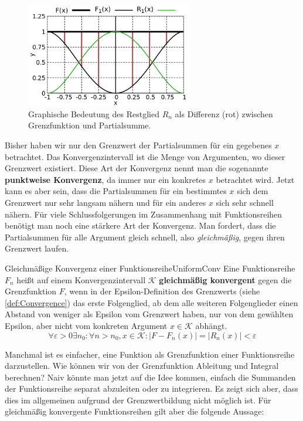\begin{figure}
    \centering
    \includegraphics[width=0.65\textwidth]{./gnuplot/function-sum-error-term}
    \caption[Restglied zwischen Grenzfunktion und Partialsumme]{Graphische Bedeutung des Restglied $R_n$ als Differenz (rot) zwischen Grenzfunktion und Partialsumme.}
    \label{fig:ExFunErrTerm}
\end{figure}

Bisher haben wir nur den Grenzwert der Partialsummen für ein gegebenes $x$ betrachtet. Das Konvergenzintervall ist die Menge von Argumenten, wo dieser Grenzwert existiert. Diese Art der Konvergenz nennt man die sogenannte \textbf{punktweise Konvergenz}, da immer nur ein konkretes $x$ betrachtet wird. Jetzt kann es aber sein, dass die Partialsummen für ein bestimmtes $x$ sich dem Grenzwert nur sehr langsam nähern und für ein anderes $x$ sich sehr schnell nähern. Für viele Schlussfolgerungen im Zusammenhang mit Funktionsreihen benötigt man noch eine stärkere Art der Konvergenz. Man fordert, dass die Partialsummen für alle Argument gleich schnell, also \emph{gleichmäßig}, gegen ihren Grenzwert laufen.

\begin{definition}{Gleichmäßige Konvergenz einer Funktionsreihe}{UniformConv}
    Eine Funktionsreihe $F_n$ heißt auf einem Konvergenzintervall $\mathcal{K}$ \textbf{gleichmäßig konvergent} gegen die Grenzfunktion $F$, wenn in der Epsilon-Definition des Grenzwerts (siehe \ref{def:Convergence}) das erste Folgenglied, ab dem alle weiteren Folgenglieder einen Abstand von weniger als Epsilon vom Grenzwert haben, nur von dem gewählten Epsilon, aber nicht vom konkreten Argument $x\in\mathcal{K}$ abhängt.
    $$
        \forall \varepsilon > 0 \exists n_0: \forall n > n_0, x \in \mathcal{K}: |F-F_n(x)| = |R_n(x)| < \varepsilon
    $$
\end{definition}

Manchmal ist es einfacher, eine Funktion als Grenzfunktion einer Funktionsreihe darzustellen. Wie können wir von der Grenzfunktion Ableitung und Integral berechnen? Naiv könnte man jetzt auf die Idee kommen, einfach die Summanden der Funktionsreihe separat abzuleiten oder zu integrieren. Es zeigt sich aber, dass dies im allgemeinen aufgrund der Grenzwertbildung nicht möglich ist. Für gleichmäßig konvergente Funktionsreihen gilt aber die folgende Aussage:

